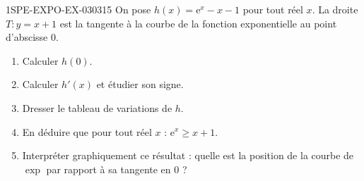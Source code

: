 \begin{exercice}{1SPE-EXPO-EX-030}{3}{15}
On pose $h(x) = \mathrm{e}^x - x - 1$ pour tout réel $x$. La droite $T : y = x + 1$ est la tangente à la courbe de la fonction exponentielle au point d'abscisse $0$.
\begin{enumerate}
  \item Calculer $h(0)$.
  \item Calculer $h'(x)$ et étudier son signe.
  \item Dresser le tableau de variations de $h$.
  \item En déduire que pour tout réel $x$ : $\mathrm{e}^x \geqslant x + 1$.
  \item Interpréter graphiquement ce résultat : quelle est la position de la courbe de $\exp$ par rapport à sa tangente en $0$ ?
\end{enumerate}
\end{exercice}
